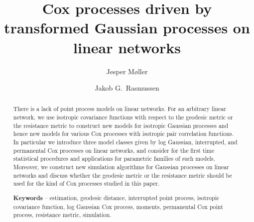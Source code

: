 \documentclass[alpha-refs]{wiley-article}
\title{Cox processes driven by transformed Gaussian processes on linear networks}
\author[1]{Jesper M\o ller}
\author[1]{Jakob G.\ Rasmussen}
\affil[1]{Department of Mathematical Sciences, Aalborg University, Skjernvej 4A, DK-9220~Aalborg~\O, Denmark}
\begin{document}
\maketitle

\begin{abstract}
{There is a lack of point process models on linear networks. For an arbitrary linear network, we
 use isotropic covariance functions with respect to the geodesic metric  or the resistance metric 
 to construct new models for isotropic Gaussian processes and hence new models for various Cox processes with isotropic pair correlation functions. In particular we introduce three model classes given by log Gaussian, interrupted, and permanental Cox processes on linear networks,
 and consider for the first time statistical procedures and applications for parametric families of such models.
 Moreover, we construct new simulation algorithms for Gaussian processes  on linear networks and
discuss whether the geodesic metric  or the resistance metric should be used for the kind of Cox processes studied in this paper.}

\textbf{Keywords} -- 
estimation,
geodesic distance,
interrupted point process,
isotropic covariance function,
log Gaussian Cox process,
moments, %
permanental Cox point process, %
resistance metric,
simulation.
\end{abstract}





%
\end{document}

